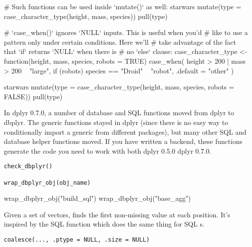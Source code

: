 \documentclass[a4paper]{book}
\begin{document}
\begin{Examples}
\begin{ExampleCode}
# Such functions can be used inside `mutate()` as well:
starwars %
  mutate(type = case_character_type(height, mass, species)) %
  pull(type)

# `case_when()` ignores `NULL` inputs. This is useful when you'd
# like to use a pattern only under certain conditions. Here we'll
# take advantage of the fact that `if` returns `NULL` when there is
# no `else` clause:
case_character_type <- function(height, mass, species, robots = TRUE) {
  case_when(
    height > 200 | mass > 200 ~ "large",
    if (robots) species == "Droid" ~ "robot",
    .default = "other"
  )
}

starwars %
  mutate(type = case_character_type(height, mass, species, robots = FALSE)) %
  pull(type)
\end{ExampleCode}
\end{Examples}
%
\begin{Description}
In dplyr 0.7.0, a number of database and SQL functions moved from dplyr to
dbplyr. The generic functions stayed in dplyr (since there is no easy way
to conditionally import a generic from different packages), but many other
SQL and database helper functions moved. If you have written a backend,
these functions generate the code you need to work with both dplyr 0.5.0
dplyr 0.7.0.
\end{Description}
%
\begin{Usage}
\begin{verbatim}
check_dbplyr()

wrap_dbplyr_obj(obj_name)
\end{verbatim}
\end{Usage}
%
\begin{Examples}
\begin{ExampleCode}

wrap_dbplyr_obj("build_sql")
wrap_dbplyr_obj("base_agg")

\end{ExampleCode}
\end{Examples}
%
\begin{Description}
Given a set of vectors,  finds the first non-missing value at
each position. It's inspired by the SQL  function which does the
same thing for SQL s.
\end{Description}
%
\begin{Usage}
\begin{verbatim}
coalesce(..., .ptype = NULL, .size = NULL)
\end{verbatim}
\end{Usage}
\end{document}
